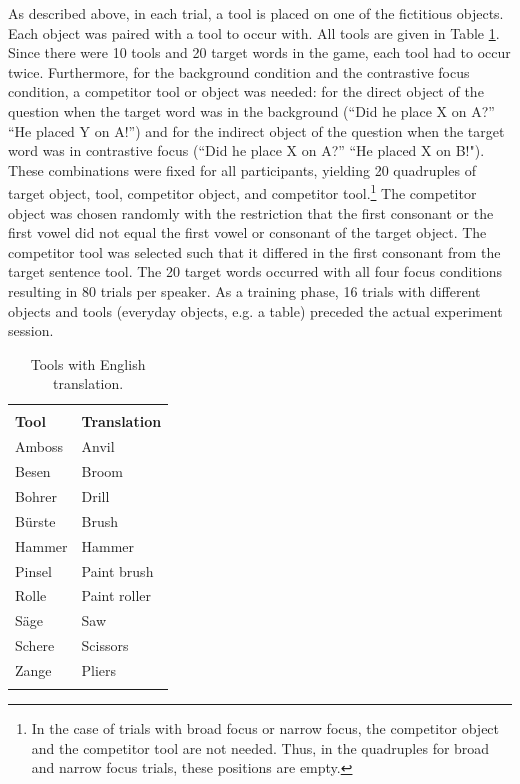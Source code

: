 As described above, in each trial, a tool is placed on one of the fictitious objects. Each object was paired with a tool to occur with. All tools are given in Table \ref{tab:tools}. Since there were 10 tools and 20 target words in the game, each tool had to occur twice. Furthermore, for the background condition and the contrastive focus condition, a competitor tool or object was needed: for the direct object of the question when the target word was in the background (``Did he place X on A?” “He placed Y on A!”) and for the indirect object of the question when the target word was in contrastive focus (``Did he place X on A?” “He placed X on B!"). These combinations were fixed for all participants, yielding 20 quadruples of target object, tool, competitor object, and competitor tool.\footnote{In the case of trials with broad focus or narrow focus, the competitor object and the competitor tool are not needed. Thus, in the quadruples for broad and narrow focus trials, these positions are empty.} The competitor object was chosen randomly with the restriction that the first consonant or the first vowel did not equal the first vowel or consonant of the target object. The competitor tool was selected such that it differed in the first consonant from the target sentence tool. The 20 target words occurred with all four focus conditions resulting in 80 trials per speaker. As a training phase, 16 trials with different objects and tools (everyday objects, e.g. a table) preceded the actual experiment session. 

\begin{table}
\caption{Tools with English translation.}
\begin{tabularx}{\textwidth}{Xl}
	\lsptoprule\\
\textbf{Tool} & \textbf{Translation} \\
\hline
Amboss & Anvil \\
Besen & Broom \\
Bohrer & Drill \\
Bürste & Brush \\
Hammer & Hammer \\
Pinsel & Paint brush \\ 
Rolle & Paint roller \\ 
Säge & Saw \\
Schere & Scissors \\
Zange & Pliers\\
\lspbottomrule
\end{tabularx}
\label{tab:tools}
\end{table}

